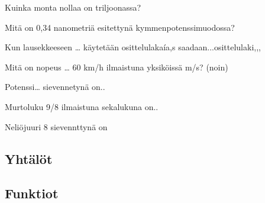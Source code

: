 \begin{tehtava}
Kuinka monta nollaa on triljoonassa?
\begin{alakohdat}
\end{alakohdat}
\end{tehtava}

\begin{tehtava}
Mitä on 0,34 nanometriä esitettynä kymmenpotenssimuodossa?
\begin{alakohdat}
\end{alakohdat}
\end{tehtava}

\begin{tehtava}
Kun lausekkeeseen … käytetään osittelulakaía,s saadaan...osittelulaki,,,
\end{tehtava}

\begin{tehtava}
Mitä on nopeus … 60 km/h ilmaistuna yksiköissä m/s? (noin)
\begin{alakohdat}
\end{alakohdat}
\end{tehtava}

\begin{tehtava}
Potenssi… sievennetynä on..
\begin{alakohdat}
\end{alakohdat}
\end{tehtava}

\begin{tehtava}
Murtoluku 9/8 ilmaistuna sekalukuna on..
\begin{alakohdat}
\end{alakohdat}
\end{tehtava}

\begin{tehtava}
Neliöjuuri 8 sievennttynä on
\begin{alakohdat}
\end{alakohdat}
\end{tehtava}

\subsection*{Yhtälöt}

\subsection*{Funktiot}
